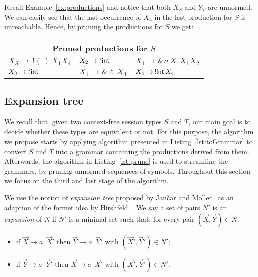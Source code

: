 \begin{example}
  \label{ex:prune}
  Recall Example~\ref{ex:productions} and notice that both
  $X_S$ and
  $Y_T$ are unnormed. We can easily see that the last occurrence of
  $X_4$ in the last production for
  $S$ is unreachable. Hence, by pruning the productions for
  $S$ we get:
  \begin{center}
    \begin{tabular}{l l l}
      \multicolumn{3}{c}{Pruned productions for $S$}\\ \hline
      $X_S \rightarrow \,! (\,)\,X_1 X_4$ &
      $X_2 \rightarrow \,? \mathsf{int}$ &
      $X_1 \rightarrow \& n\, X_1 X_1 X_2$
      \\
      $X_3 \rightarrow \,? \mathsf{int}$ &
      $X_1 \rightarrow \& \ell\, X_3$ &
      $X_4 \rightarrow \,!\mathsf{int}\, X_4$
    \end{tabular}
  \end{center}
\end{example}

\subsection{Expansion tree}
\label{subsec:expand}

We recall that, given two context-free session types $S$ and $T$, our main goal
is to decide whether these types are equivalent or not. For this purpose,
the algorithm we propose starts by applying algorithm presented in
Listing~\ref{lst:toGrammar} to convert $S$ and $T$ into a grammar containing
the productions derived from them. Afterwards, the algorithm in
Listing~\ref{lst:prune} is used to streamline the grammars, by pruning
unnormed sequences of symbols. Throughout this section we focus on the
third and last stage of the algorithm.

We use the notion of \emph{expansion tree} proposed by Jan{\v{c}}ar
and Moller~\cite{janvcar1999techniques} as an adaption of the former idea by
Hirshfeld~\cite{hirshfeld1996bisimulation}. We say a set of pairs $N'$ is an
\emph{expansion} of $N$ if $N'$ is a minimal set such that: for every pair
$(\vec X, \vec Y) \in N$,
\begin{itemize}
	\item if $\vec X \rightarrow a \enspace\vec X'$ then $\vec Y \rightarrow
		  a \enspace\vec Y'$ with $(\vec X',\vec Y')\in N'$;
	\item if $\vec Y \rightarrow a \enspace\vec Y'$ then $\vec X \rightarrow
	      a \enspace\vec X'$ with $(\vec X',\vec Y')\in N'$.
\end{itemize}

